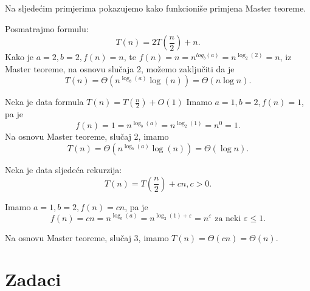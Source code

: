 Na sljedećim primjerima pokazujemo kako funkcioniše primjena Master teoreme. %
 

\begin{example}
	Posmatrajmo formulu:
	$$T(n) = 2T\left(\frac{n}{2}\right) + n.$$
	Kako je $a = 2, b = 2, f(n) = n$, te $f(n) = n = n^{log_b (a)} = n^{\log_2 (2)} = n$, iz Master teoreme, na osnovu slučaja 2,  možemo zaključiti da je 
	$$T(n) = \Theta (n^{\log_b (a)} \log (n)) = \Theta (n \log n).$$
\end{example}

\begin{example} Neka je data formula
	$T(n) = T(\frac{n}{2}) + O(1)$
	Imamo $a = 1, b = 2, f(n) = 1$, pa je $$f(n) = 1 = n^{\log_b (a)} = n^{\log_2 (1)} = n^{0} = 1.$$
	Na osnovu Master teoreme, slučaj 2, imamo
	$$T(n) = \Theta (n^{\log_b (a)} \log (n)) = \Theta (\log n).$$
\end{example}

\begin{example}
	Neka je data sljedeća rekurzija:
	$$T(n) = T(\frac{n}{2}) + cn, c >0.$$
	
	Imamo $a = 1, b = 2, f(n) = cn$, pa je 
	$$f(n) = cn = n^{\log_b (a)} = n^{\log_2 (1) + \varepsilon} = n^{\varepsilon} \text{ za neki } \varepsilon \leq 1.$$
	
	Na osnovu Master teoreme, slučaj 3, imamo %
	$T(n)  = \Theta (cn) = \Theta(n).$
\end{example}

\section*{Zadaci}

